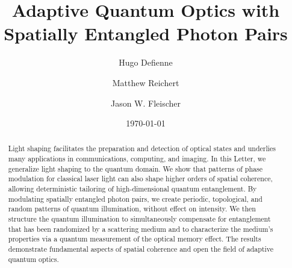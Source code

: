 \documentclass[%
 reprint,
 amsmath,amssymb,
 aps
]{revtex4-1}
\begin{document}

\title{Adaptive Quantum Optics with Spatially Entangled Photon Pairs}%

\author{Hugo Defienne}
\author{Matthew Reichert}%
\author{Jason W. Fleischer}%
%

\date{\today}

\begin{abstract}
Light shaping facilitates the preparation and detection of optical states and underlies many applications
in communications, computing, and imaging. In this Letter, we generalize light shaping to the quantum
domain. We show that patterns of phase modulation for classical laser light can also shape higher orders
of spatial coherence, allowing deterministic tailoring of high-dimensional quantum entanglement. By
modulating spatially entangled photon pairs, we create periodic, topological, and random patterns of
quantum illumination, without effect on intensity. We then structure the quantum illumination to
simultaneously compensate for entanglement that has been randomized by a scattering medium and to
characterize the medium’s properties via a quantum measurement of the optical memory effect. The results
demonstrate fundamental aspects of spatial coherence and open the field of adaptive quantum optics.
\end{abstract}

\maketitle
\end{document}

